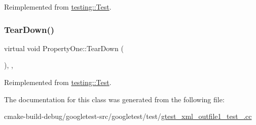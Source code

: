 Reimplemented from \mbox{\hyperlink{classtesting_1_1Test_a190315150c303ddf801313fd1a777733}{testing\+::\+Test}}.

\mbox{\label{classPropertyOne_a3ed895113848403d5ea27f52a1bb0545}} 
\subsubsection{\texorpdfstring{TearDown()}{TearDown()}}
{\footnotesize\ttfamily virtual void Property\+One\+::\+Tear\+Down (\begin{DoxyParamCaption}{ }\end{DoxyParamCaption})\hspace{0.3cm}{\ttfamily [inline]}, {\ttfamily [protected]}, {\ttfamily [virtual]}}



Reimplemented from \mbox{\hyperlink{classtesting_1_1Test_a5f0ab439802cbe0ef7552f1a9f791923}{testing\+::\+Test}}.



The documentation for this class was generated from the following file\+:\begin{DoxyCompactItemize}
\item 
cmake-\/build-\/debug/googletest-\/src/googletest/test/\mbox{\hyperlink{gtest__xml__outfile1__test___8cc}{gtest\+\_\+xml\+\_\+outfile1\+\_\+test\+\_\+.\+cc}}\end{DoxyCompactItemize}
